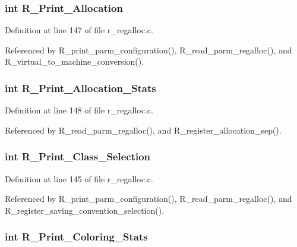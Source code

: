 \subsubsection{\setlength{\rightskip}{0pt plus 5cm}int \bf{R\_\-Print\_\-Allocation}}\label{r__regalloc_8h_5fc9cc940655d6f372ab7f78f935f2ea}




Definition at line 147 of file r\_\-regalloc.c.

Referenced by R\_\-print\_\-parm\_\-configuration(), R\_\-read\_\-parm\_\-regalloc(), and R\_\-virtual\_\-to\_\-machine\_\-conversion().
\subsubsection{\setlength{\rightskip}{0pt plus 5cm}int \bf{R\_\-Print\_\-Allocation\_\-Stats}}\label{r__regalloc_8h_f73157ef01eb0a33ef27781f0ac04eb2}




Definition at line 148 of file r\_\-regalloc.c.

Referenced by R\_\-read\_\-parm\_\-regalloc(), and R\_\-register\_\-allocation\_\-sep().
\subsubsection{\setlength{\rightskip}{0pt plus 5cm}int \bf{R\_\-Print\_\-Class\_\-Selection}}\label{r__regalloc_8h_e994b9ea68b7534a169ab7286c0ac2ae}




Definition at line 145 of file r\_\-regalloc.c.

Referenced by R\_\-print\_\-parm\_\-configuration(), R\_\-read\_\-parm\_\-regalloc(), and R\_\-register\_\-saving\_\-convention\_\-selection().
\subsubsection{\setlength{\rightskip}{0pt plus 5cm}int \bf{R\_\-Print\_\-Coloring\_\-Stats}}\label{r__regalloc_8h_d0b75992fe4dd4f551a7a3d4045e63e4}





